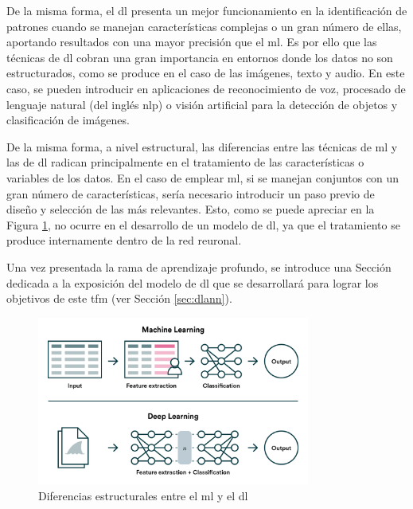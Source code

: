 \vspace{3mm}

De la misma forma, el \gls{dl} presenta un mejor funcionamiento en la identificación de patrones cuando se manejan características complejas o un gran número de ellas, aportando resultados con una mayor precisión que el \gls{ml}. Es por ello que las técnicas de \gls{dl} cobran una gran importancia en entornos donde los datos no son estructurados, como se produce en el caso de las imágenes, texto y audio. En este caso, se pueden introducir en aplicaciones de reconocimiento de voz, procesado de lenguaje natural (del inglés \gls{nlp}) o visión artificial para la detección de objetos y clasificación de imágenes. \cite{iageeks}

\vspace{3mm}

De la misma forma, a nivel estructural, las diferencias entre las técnicas de \gls{ml} y las de \gls{dl} radican principalmente en el tratamiento de las características o variables de los datos. En el caso de emplear \gls{ml}, si se manejan conjuntos con un gran número de características, sería necesario introducir un paso previo de diseño y selección de las más relevantes. Esto, como se puede apreciar en la Figura \ref{fig:features}, no ocurre en el desarrollo de un modelo de \gls{dl}, ya que el tratamiento se produce internamente dentro de la red reuronal. \cite{valohai}

\vspace{3mm}

Una vez presentada la rama de aprendizaje profundo, se introduce una Sección dedicada a la exposición del modelo de \gls{dl} que se desarrollará para lograr los objetivos de este \gls{tfm} (ver Sección \ref{sec:dlann}). 

\vspace{3mm}

\begin{figure}[h!]
    \centering
    \includegraphics[width=0.8\textwidth]{img/teoria/mlvsdl.png}
    \caption{Diferencias estructurales entre el \acrshort{ml} y el \acrshort{dl} \cite{valohai}}
    \label{fig:features}
\end{figure}

